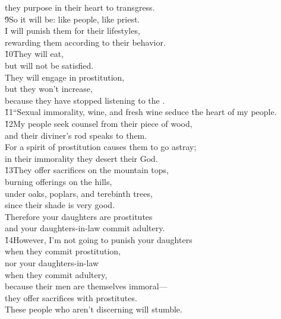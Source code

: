 \begin{poetry}
\poemll    they purpose in their heart to transgress. \\
\poeml \v{9}So it will be: like people, like priest. \\
\poemll    I will punish them for their lifestyles, \\
\poemlll       rewarding them according to their behavior. \\
\poeml \v{10}They will eat, \\
\poemll    but will not be satisfied. \\
\poeml They will engage in prostitution, \\
\poemll    but they won't increase, \\
\poemlll       because they have stopped listening to the . \\
\poeml \v{11}``Sexual immorality, wine, and fresh wine seduce the heart of my people. \\
\poeml \v{12}My people seek counsel from their piece of wood, \\
\poemll    and their diviner's rod speaks to them. \\
\poeml For a spirit of prostitution causes them to go astray; \\
\poemll    in their immorality they desert their God. \\
\poeml \v{13}They offer sacrifices on the mountain tops, \\
\poemll    burning offerings on the hills, \\
\poeml under oaks, poplars, and terebinth trees, \\
\poemll    since their shade is very good. \\
\poeml Therefore your daughters are prostitutes \\
\poemll    and your daughters-in-law commit adultery. \\
\poeml \v{14}However, I'm not going to punish your daughters \\
\poemll    when they commit prostitution, \\
\poeml nor your daughters-in-law \\
\poemll    when they commit adultery, \\
\poeml because their men are themselves immoral--- \\
\poemll    they offer sacrifices with prostitutes. \\
\poeml These people who aren't discerning will stumble. \\

\end{poetry}
